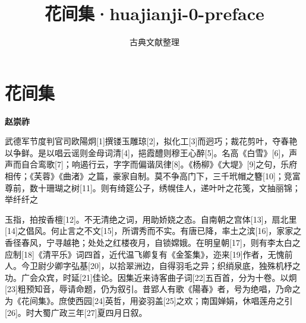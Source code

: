 \documentclass[12pt,a4paper]{ctexbook}
\title{花间集·huajianji-0-preface}
\author{古典文献整理}
\date{}
\begin{document}
\maketitle
\tableofcontents
\newpage
\section{花间集}
\textbf{赵崇祚}\par\vspace{0.5em}
武德军节度判官司欧陽炯[1]撰镂玉雕琼[2]，拟化工[3]而迥巧；裁花剪叶，夺春艳以争鲜。是以唱云谣则金母词清[4]，挹霞醴则穆王心醉[5]。名高《白雪》[6]，声声而自合鸾歌[7]；响遏行云，字字而偏谐凤律[8]。《杨柳》《大堤》[9]之句，乐府相传；《芙蓉》《曲渚》之篇，豪家自制。莫不争高门下，三千玳帽之簪[10]；竞富尊前，数十珊瑚之树[11]。则有绮筵公子，绣幌佳人，递叶叶之花笺，文抽丽锦；举纤纤之\par
玉指，拍按香檀[12]。不无清绝之词，用助娇娆之态。自南朝之宫体[13]，扇北里[14]之倡风。何止言之不文[15]，所谓秀而不实。有唐已降，率土之滨[16]，家家之香径春风，宁寻越艳；处处之红楼夜月，自锁嫦娥。在明皇朝[17]，则有李太白之应制[18]《清平乐》词四首，近代温飞卿复有《金筌集》，迩来[19]作者，无愧前人。今卫尉少卿字弘基[20]，以拾翠洲边，自得羽毛之异；织绡泉底，独殊机杼之功。广会众宾，时延[21]佳论。因集近来诗客曲子词[22]五百首，分为十卷。以炯[23]粗预知音，辱请命题，仍为叙引。昔郢人有歌《陽春》者，号为绝唱，乃命之为《花间集》。庶使西园[24]英哲，用姿羽盖[25]之欢；南国婵娟，休唱莲舟之引[26]。时大蜀广政三年[27]夏四月日叙。\par
\end{document}

